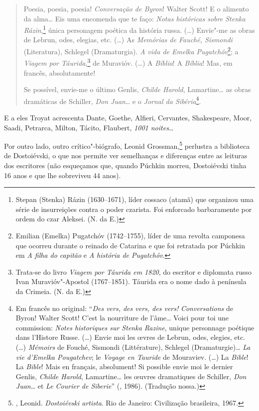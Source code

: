 \begin{quote}
Poesia, poesia, poesia! \emph{Conversação de Byron}! Walter Scott! E o alimento da alma\ldots{} Eis uma encomenda que te faço: \emph{Notas históricas sobre Stenka Rázin},\footnote{Stepan (Stenka) Rázin (1630--1671), líder cossaco (atamã) que organizou uma série de insurreições contra o poder czarista. Foi enforcado barbaramente por ordem do czar Aleksei. (N. da E.)} única personagem poética da história russa. (\ldots{}) Envie"-me as obras de Lebrun, odes, elegias, etc. (\ldots{}) As \emph{Memórias de Fauché, Sismondi} (Literatura), Schlegel (Dramaturgia). \emph{A vida de Emelka Pugatchóv}\footnote{Emilian (Emelka) Pugatchóv (1742--1755), líder de uma revolta camponesa que ocorreu durante o reinado de Catarina  e que foi retratada por Púchkin em \emph{A filha do capitão} e \emph{A história de Pugatchóv}.}; a \emph{Viagem por Táurida},\footnote{Trata-se do livro \emph{Viagem por Táurida em 1820}, do escritor e diplomata russo Ivan Muravióv"-Apostol (1767--1851). Táurida era o nome dado à península da Crimeia. (N. da E.)} de Muravióv. (\ldots{}) A \emph{Bíblia}! A \emph{Bíblia}! Mas, em francês, absolutamente!

Se possível, envie-me o último Genlis, \emph{Childe Harold}, Lamartine\ldots{} as obras dramáticas de Schiller, \emph{Don Juan}\ldots{} e o \emph{Jornal da Sibéria}\footnote{Em francês no original: ``\emph{Des vers, des vers, des vers!} \emph{Conversations} de Byron! Walter Scott! C'est la nourriture de l'âme\ldots{} Voici pour toi une commission: \emph{Notes historiques sur Stenka Razine}, unique personnage poétique dans l'Histore Russe. (\ldots{}) Envie moi les œvres de Lebrun, odes, elegies, etc. (\ldots{}) \emph{Mémoirs} de Fouché, Sismondi (Littérature), Schlegel (Dramaturgie)\ldots{} \emph{La vie d'Emelka Pougatchev}; le \emph{Voyage en Tauride} de Mouraviev. (\ldots{}) La \emph{Bible}! La \emph{Bible}! Mais en français, absolument! Si possible envie moi le dernier Genlis, \emph{Childe Harold}, Lamartine\ldots{} les œuvres dramatiques de Schiller, \emph{Don Juan}\ldots{} et \emph{Le Courier de Siberie}'' (, 1986). (Tradução nossa.)}.
\end{quote}

E a eles Troyat acrescenta Dante, Goethe, Alfieri, Cervantes,
Shakespeare, Moor, Saadi, Petrarca, Milton, Tácito, Flaubert, \emph{1001
noites}\ldots{}

Por outro lado, outro crítico"-biógrafo, Leonid Grossman,\footnote{, Leonid. \emph{Dostoiévski artista}. Rio de Janeiro: Civilização brasileira, 1967.} perlustra a biblioteca de Dostoiévski, o que nos permite ver semelhanças e diferenças entre as leituras dos escritores (não esqueçamos que, quando Púchkin morreu, Dostoiévski tinha 16 anos e que lhe sobreviveu 44 anos).

